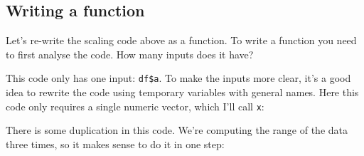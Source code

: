 \documentclass[]{book}
\newenvironment{Shaded}{\begin{snugshade}}{\end{snugshade}}
\newcommand{\KeywordTok}[1]{\textcolor[rgb]{0.13,0.29,0.53}{\textbf{#1}}}
\newcommand{\DataTypeTok}[1]{\textcolor[rgb]{0.13,0.29,0.53}{#1}}
\newcommand{\DecValTok}[1]{\textcolor[rgb]{0.00,0.00,0.81}{#1}}
\newcommand{\StringTok}[1]{\textcolor[rgb]{0.31,0.60,0.02}{#1}}
\newcommand{\CommentTok}[1]{\textcolor[rgb]{0.56,0.35,0.01}{\textit{#1}}}
\newcommand{\OperatorTok}[1]{\textcolor[rgb]{0.81,0.36,0.00}{\textbf{#1}}}
\newcommand{\NormalTok}[1]{#1}
\begin{document}
\subsection{Writing a function}\label{writing-a-function}

Let's re-write the scaling code above as a function. To write a function
you need to first analyse the code. How many inputs does it have?

\begin{Shaded}
\end{Shaded}

This code only has one input: \texttt{df\$a}. To make the inputs more
clear, it's a good idea to rewrite the code using temporary variables
with general names. Here this code only requires a single numeric
vector, which I'll call \texttt{x}:

\begin{Shaded}
\end{Shaded}

There is some duplication in this code. We're computing the range of the
data three times, so it makes sense to do it in one step:
\end{document}
